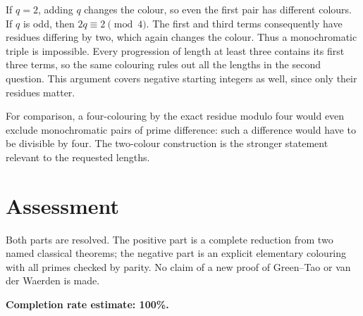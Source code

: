 \documentclass[11pt]{article}
\begin{document}
If $q=2$, adding $q$ changes the colour, so even the first pair has different colours. If $q$ is odd, then $2q\equiv2\pmod4$. The first and third terms consequently have residues differing by two, which again changes the colour. Thus a monochromatic triple is impossible. Every progression of length at least three contains its first three terms, so the same colouring rules out all the lengths in the second question. This argument covers negative starting integers as well, since only their residues matter.

For comparison, a four-colouring by the exact residue modulo four would even exclude monochromatic pairs of prime difference: such a difference would have to be divisible by four. The two-colour construction is the stronger statement relevant to the requested lengths.

\section*{Assessment}
Both parts are resolved. The positive part is a complete reduction from two named classical theorems; the negative part is an explicit elementary colouring with all primes checked by parity. No claim of a new proof of Green--Tao or van der Waerden is made.

\textbf{Completion rate estimate: 100\%.}
\end{document}
